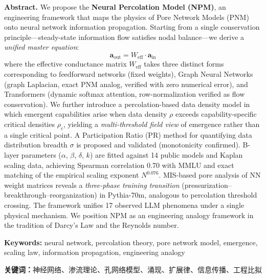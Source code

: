 \documentclass[11pt,a4paper]{article}
\newcommand{\Weff}{W_{\text{eff}}}
\begin{document}
\bigskip
\noindent\textbf{Abstract.}\quad
We propose the \textbf{Neural Percolation Model (NPM)}, an engineering framework
that maps the physics of Pore Network Models (PNM) onto neural network information
propagation. Starting from a single conservation principle---steady-state information
flow satisfies nodal balance---we derive a \emph{unified master equation}:
\[
  \mathbf{a}_{\text{out}} = \Weff \cdot \mathbf{a}_{\text{in}}
\]
where the effective conductance matrix $\Weff$ takes three distinct forms
corresponding to feedforward networks (fixed weights), Graph Neural Networks
(graph Laplacian, exact PNM analog, verified with zero numerical error), and
Transformers (dynamic softmax attention, row-normalization verified as flow
conservation). We further introduce a percolation-based data density model in
which emergent capabilities arise when data density $\rho$ exceeds
capability-specific critical densities $\rho_c$, yielding a \emph{multi-threshold
field view} of emergence rather than a single critical point. A Participation
Ratio (PR) method for quantifying data distribution breadth $\sigma$ is proposed
and validated (monotonicity confirmed). B-layer parameters
($\alpha$, $\beta$, $\delta$, $k$) are fitted against 14 public models and
Kaplan scaling data, achieving Spearman correlation 0.70 with MMLU and exact
matching of the empirical scaling exponent $N^{0.076}$.
MIS-based pore analysis of NN weight matrices reveals a \emph{three-phase
training transition} (pressurization--breakthrough--reorganization) in
Pythia-70m, analogous to percolation threshold crossing. The framework
unifies 17 observed LLM phenomena under a single physical mechanism.
We position NPM as an engineering analogy framework in the tradition of Darcy's
Law and the Reynolds number.

\noindent\textbf{Keywords:} neural network, percolation theory, pore network model, emergence, scaling law, information propagation, engineering analogy

\textbf{关键词：}神经网络、渗流理论、孔网络模型、涌现、扩展律、信息传播、工程比拟

\end{document}
